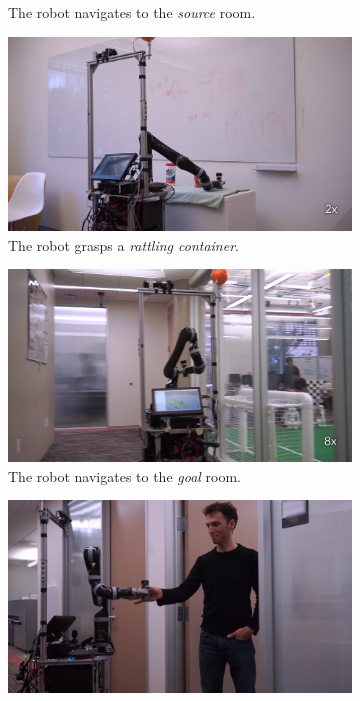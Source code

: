 \documentclass[final]{beamer}
\newcommand{\setblocksize}{\Large \centering}
\newcommand{\setsize}{\normalsize}
\begin{document}
\begin{frame}{}
\begin{columns}[t]
\begin{column}{.49\linewidth}
\begin{block}{\setblocksize }
{\begin{figure}
\begin{subfigure}{0.4\textwidth}
  \caption{\setsize The robot navigates to the \emph{source} room.}
\end{subfigure}
\begin{subfigure}{0.4\textwidth}
  \centering
  \includegraphics[width=\linewidth]{figures/demo_4.png}
  \caption{\setsize The robot grasps a \emph{rattling container}.}
\end{subfigure}
\begin{subfigure}{0.4\textwidth}
  \centering
  \includegraphics[width=\linewidth]{figures/demo_5.png}
  \caption{\setsize The robot navigates to the \emph{goal} room.}
\end{subfigure}
\begin{subfigure}{0.4\textwidth}
  \centering
  \includegraphics[width=\linewidth]{figures/demo_6.png}

\end{subfigure}
\end{figure}}
\end{block}
\end{column}
\end{columns}
\end{frame}
\end{document}
